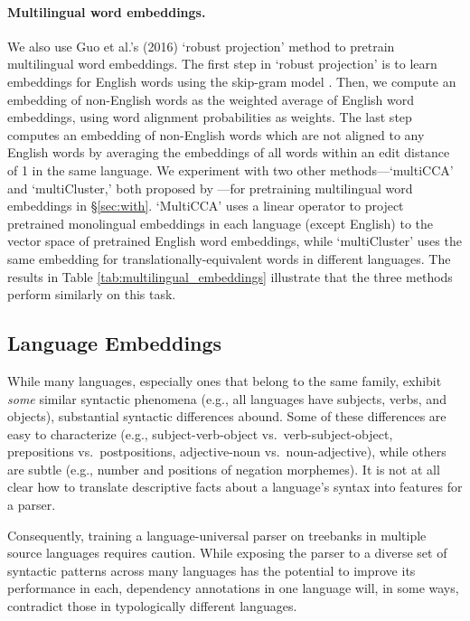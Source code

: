 \documentclass[11pt]{article}
\begin{document}
\paragraph{Multilingual word embeddings.} We also use Guo et al.'s (2016) \nocite{guo:16} `robust projection' method to pretrain multilingual word embeddings.
The first step in `robust projection' is to learn embeddings for English words using the skip-gram model \cite{mikolov:13}.
Then, we compute an embedding of non-English words as the weighted average of English word embeddings, using word alignment probabilities as weights.
The last step computes an embedding of non-English words which are not aligned to any English words by averaging the embeddings of all words within an edit distance of 1 in the same language.
We experiment with two other methods---`multiCCA' and `multiCluster,' both proposed by ---for pretraining multilingual word embeddings in \S\ref{sec:with}.
`MultiCCA' uses a linear operator to project pretrained monolingual embeddings in each language (except English) to the vector space of pretrained English word embeddings, while `multiCluster' uses the same embedding for translationally-equivalent words in different languages.
The results in Table \ref{tab:multilingual_embeddings} illustrate that the three methods perform similarly on this task.

\subsection{Language Embeddings}
\label{sec:lang}

While many languages, especially ones that belong to the same family, exhibit \textit{some} similar syntactic phenomena (e.g., all languages have subjects, verbs, and objects), substantial syntactic differences abound.
Some of these differences are easy to characterize (e.g., subject-verb-object vs.~verb-subject-object, prepositions vs.~postpositions, adjective-noun vs.~noun-adjective), while others are subtle (e.g., number and positions of negation morphemes).  It is not at all clear how to translate descriptive facts about a language's syntax into features for a parser.

Consequently, training a language-universal parser on treebanks in multiple source languages requires caution.  While exposing the parser to a diverse set of syntactic patterns across many languages has the potential to improve its performance in each, dependency annotations in one language will, in some ways, contradict those in typologically different languages.
\end{document}
